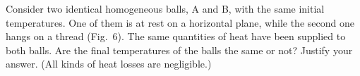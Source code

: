 Consider two identical homogeneous balls, A and B, with the same initial
temperatures. One of them is at rest on a horizontal plane, while the second one
hangs on a thread (Fig.~6). The same quantities of heat have been supplied to
both balls. Are the final temperatures of the balls the same or not? Justify
your answer. (All kinds of heat losses are negligible.)

\begin{center}
\end{center}
